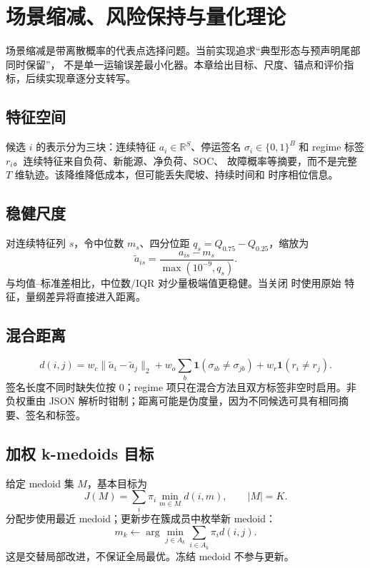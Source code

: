\section{场景缩减、风险保持与量化理论}
\label{sec:scenario-reduction-theory}

\begin{theorynote}
场景缩减是带离散概率的代表点选择问题。当前实现追求“典型形态与预声明尾部同时保留”，
不是单一运输误差最小化器。本章给出目标、尺度、锚点和评价指标，后续实现章逐分支转写。
\end{theorynote}

\subsection{特征空间}
候选 $i$ 的表示分为三块：连续特征 $a_i\in\mathbb R^S$、停运签名
$\sigma_i\in\{0,1\}^B$ 和 regime 标签 $r_i$。连续特征来自负荷、新能源、净负荷、SOC、
故障概率等摘要，而不是完整 $T$ 维轨迹。该降维降低成本，但可能丢失爬坡、持续时间和
时序相位信息。

\subsection{稳健尺度}
对连续特征列 $s$，令中位数 $m_s$、四分位距 $q_s=Q_{0.75}-Q_{0.25}$，缩放为
\begin{equation}
 \widetilde a_{is}=\frac{a_{is}-m_s}{\max(10^{-9},q_s)}.
\end{equation}
与均值--标准差相比，中位数/IQR 对少量极端值更稳健。当关闭  时使用原始
特征，量纲差异将直接进入距离。

\subsection{混合距离}
\begin{equation}
 d(i,j)=w_c\|\widetilde a_i-\widetilde a_j\|_2
 +w_o\sum_b\mathbf1(\sigma_{ib}\ne\sigma_{jb})
 +w_r\mathbf1(r_i\ne r_j).
\end{equation}
签名长度不同时缺失位按 0；regime 项只在混合方法且双方标签非空时启用。非负权重由 JSON
解析时钳制；距离可能是伪度量，因为不同候选可具有相同摘要、签名和标签。

\subsection{加权 k-medoids 目标}
给定 medoid 集 $M$，基本目标为
\begin{equation}
 J(M)=\sum_i\pi_i\min_{m\in M}d(i,m),\qquad |M|=K.
\end{equation}
分配步使用最近 medoid；更新步在簇成员中枚举新 medoid：
\begin{equation}
 m_k\leftarrow\arg\min_{j\in A_k}\sum_{i\in A_k}\pi_i d(i,j).
\end{equation}
这是交替局部改进，不保证全局最优。冻结 medoid 不参与更新。

